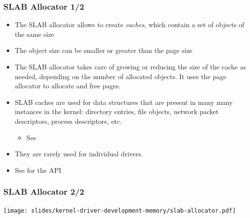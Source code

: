 \begin{frame}
  \frametitle{SLAB Allocator 1/2}
  \begin{itemize}
  \item The SLAB allocator allows to create {\em caches}, which contain a
    set of objects of the same size
  \item The object size can be smaller or greater than the page size
  \item The SLAB allocator takes care of growing or reducing the size
    of the cache as needed, depending on the number of allocated
    objects. It uses the page allocator to allocate and free pages.
  \item SLAB caches are used for data structures that are present in
    many many instances in the kernel: directory entries, file
    objects, network packet descriptors, process descriptors, etc.
    \begin{itemize}
    \item See 
    \end{itemize}
  \item They are rarely used for individual drivers.
  \item See  for the API
\end{itemize}
\end{frame}

\begin{frame}
  \frametitle{SLAB Allocator 2/2}
  \begin{center}
    \texttt{[image: slides/kernel-driver-development-memory/slab-allocator.pdf]}
  \end{center}
\end{frame}

